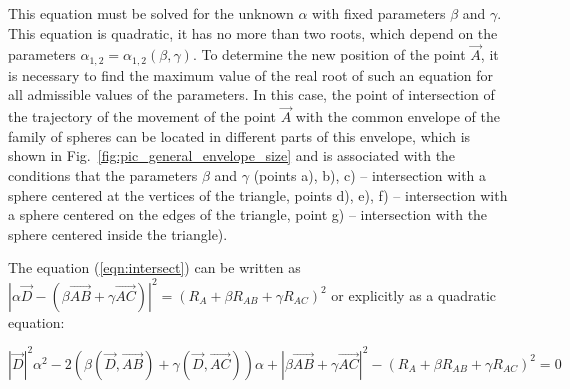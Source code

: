 \documentclass[
11pt,%
tightenlines,%
twoside,%
onecolumn,%
nofloats,%
nobibnotes,%
nofootinbib,%
superscriptaddress,%
noshowpacs,%
centertags]%
{revtex4}
\begin{document}
This equation must be solved for the unknown $\alpha$ with fixed parameters $\beta$ and $\gamma$.
This equation is quadratic, it has no more than two roots, which depend on the parameters $\alpha_{1,2} = \alpha_{1,2}(\beta, \gamma)$.
To determine the new position of the point $\vec{A}$, it is necessary to find the maximum value of the real root of such an equation for all admissible values of the parameters.
In this case, the point of intersection of the trajectory of the movement of the point $\vec{A}$ with the common envelope of the family of spheres can be located in different parts of this envelope, which is shown in Fig.~\ref{fig:pic_general_envelope_size} and is associated with the conditions that the parameters $\beta$ and $\gamma$ (points a), b), c) -- intersection with a sphere centered at the vertices of the triangle, points d), e), f) -- intersection with a sphere centered on the edges of the triangle, point g) -- intersection with the sphere centered inside the triangle).

The equation (\ref{eqn:intersect}) can be written as $|\alpha \vec{D} - (\beta \vec{AB} + \gamma \vec{AC})|^2 = (R_A + \beta R_{AB} + \gamma R_{AC})^2$ or explicitly as a quadratic equation:

\begin{equation}
|\vec{D}|^2 \alpha^2 - 2(\beta (\vec{D}, \vec{AB}) + \gamma (\vec{D}, \vec{AC})) \alpha + |\beta \vec{AB} + \gamma \vec{AC}|^2 - (R_A + \beta R_{AB} + \gamma R_{AC})^2 = 0
\end{equation}
\end{document}
